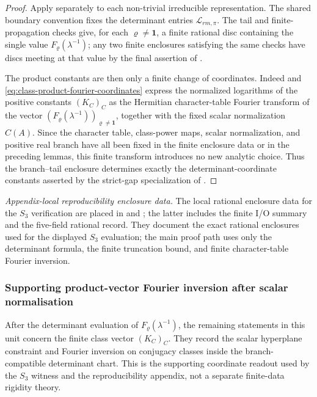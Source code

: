 \begin{proof}
  Apply  separately to each
  non-trivial irreducible representation.  The shared boundary convention fixes
  the determinant entries \(\mathcal L_{rm,\pi}\).  The tail and
  finite-propagation checks give, for each \(\varrho\ne\mathbf1\), a finite
  rational disc containing the single value
  \(F_\varrho(\lambda^{-1})\); any two finite enclosures satisfying the same checks have
  discs meeting at that value by the final assertion of
  .

  The product constants are then only a finite change of coordinates.  Indeed
   and
  \eqref{eq:class-product-fourier-coordinates} express the normalized logarithms
  of the positive constants \((K_C)_C\) as the Hermitian character-table Fourier
  transform of the vector
  \((F_\varrho(\lambda^{-1}))_{\varrho\ne\mathbf1}\), together with the fixed
  scalar normalization \(C(A)\).  Since the character table, class-power maps,
  scalar normalization, and positive real branch have all been fixed in the
  finite enclosure data or in the preceding lemmas, this finite transform
  introduces no new analytic choice.  Thus the branch--tail enclosure determines
  exactly the determinant-coordinate constants asserted by the strict-gap
  specialization of .
\end{proof}

\medskip
\noindent\textit{Appendix-local reproducibility enclosure data.}
  The local rational enclosure data for the \(S_3\) verification are placed in
   and
  ; the latter includes
  the finite I/O summary and the five-field rational record.
  They document the exact rational enclosures used for the displayed \(S_3\)
  evaluation; the main proof path uses only the determinant formula, the finite
  truncation bound, and finite character-table Fourier inversion.


\subsubsection{Supporting product-vector Fourier inversion after scalar normalisation}
\label{subsubsec:class-product-vector-rigidity}

After the determinant evaluation of \(F_\varrho(\lambda^{-1})\), the remaining
statements in this unit concern the finite class vector \((K_C)_C\).  They
record the scalar hyperplane constraint and Fourier inversion on conjugacy
classes inside the branch-compatible determinant chart.  This is the
supporting coordinate readout used by the \(S_3\) witness and the
reproducibility appendix, not a separate finite-data rigidity theory.

